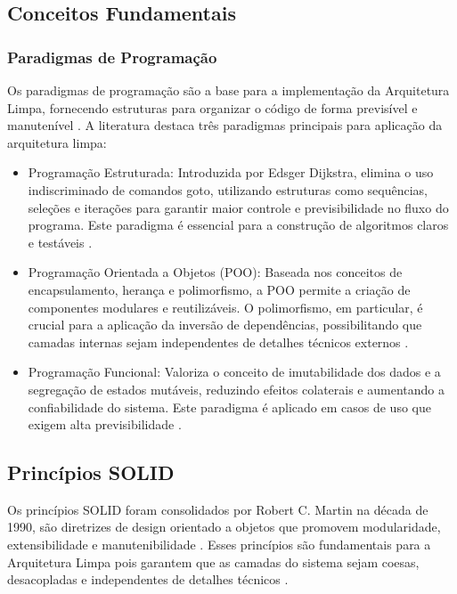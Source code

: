     \subsection{Conceitos Fundamentais}
        \subsubsection{Paradigmas de Programação}

            \par Os paradigmas de programação são a base para a implementação da Arquitetura Limpa, fornecendo estruturas para organizar o código de forma previsível e manutenível \cite{livro:martin:cleanarch}. A literatura destaca três paradigmas principais para aplicação da arquitetura limpa:

            \begin{itemize}
                \item Programação Estruturada: Introduzida por Edsger Dijkstra, elimina o uso indiscriminado de comandos goto, utilizando estruturas como sequências, seleções e iterações para garantir maior controle e previsibilidade no fluxo do programa. Este paradigma é essencial para a construção de algoritmos claros e testáveis \cite{livro:martin:cleanarch}.

                \item Programação Orientada a Objetos (POO): Baseada nos conceitos de encapsulamento, herança e polimorfismo, a POO permite a criação de componentes modulares e reutilizáveis. O polimorfismo, em particular, é crucial para a aplicação da inversão de dependências, possibilitando que camadas internas sejam independentes de detalhes técnicos externos \cite{livro:martin:cleanarch}.

                \item Programação Funcional: Valoriza o conceito de imutabilidade dos dados e a segregação de estados mutáveis, reduzindo efeitos colaterais e aumentando a confiabilidade do sistema. Este paradigma é aplicado em casos de uso que exigem alta previsibilidade \cite{livro:martin:cleanarch}.
                
            \end{itemize}

        \subsection{Princípios SOLID}
            \par Os princípios SOLID foram consolidados por Robert C. Martin na década de 1990, são diretrizes de design orientado a objetos que promovem modularidade, extensibilidade e manutenibilidade \cite{livro:martin:cleanarch}. Esses princípios são fundamentais para a Arquitetura Limpa pois garantem que as camadas do sistema sejam coesas, desacopladas e independentes de detalhes técnicos \cite{livro:martin:cleanarch}. 
            
